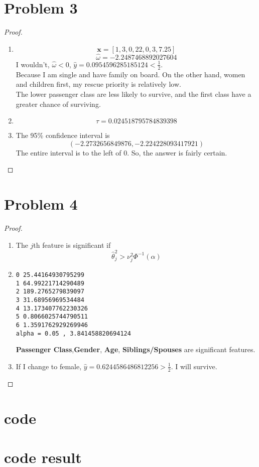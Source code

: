 \documentclass{article}
\begin{document}
\section*{Problem 3}
\begin{proof}
    \indent
    \begin{enumerate}[label=(\alph*)]
        \item $$\mathbf{x}=[1,
                            3,
                            0,
                            22,
                            0,
                            3,
                            7.25]$$
            $$\hat{\omega} = -2.2487468892027604$$
        I wouldn't, $\hat{\omega} < 0$, $\hat{y} = 0.0954596285185124 < \frac{1}{2}$.\\
        Because I am single and have family on board.
        On the other hand, women and children first, my rescue priority is relatively low.\\
        The lower passenger class are less likely to survive, and the first class have a greater chance of surviving.
        \item $$\tau = 0.024518795784839398$$
        \item The 95\% confidence interval is 
            $$(-2.2732656849876, -2.224228093417921)$$
            The entire interval is to the left of 0. So, the answer is fairly certain.
    \end{enumerate}
    \end{proof}

\section*{Problem 4}
    \begin{proof}
    \indent
    \begin{enumerate}[label=(\alph*)]
        \item  The $j$th feature is significant if
                $$\hat{\theta}_j^2 > \nu_j^2 \Phi^{-1}(\alpha)$$
        \item \begin{lstlisting}
0 25.44164930795299
1 64.99221714290489
2 189.2765279839097
3 31.68956969534484
4 13.173407762230326
5 0.8066025744790511
6 1.3591762929269946
alpha = 0.05 , 3.841458820694124
\end{lstlisting}
    \textbf{Passenger Class},\textbf{Gender}, \textbf{Age}, \textbf{Siblings/Spouses} are significant features.

        \item If I change to female, $\hat{y} = 0.6244586486812256 > \frac{1}{2}$. I will survive.
    \end{enumerate}
    \end{proof}
\pagebreak
\appendix
\section*{code}

\pagebreak
\section*{code result}

\end{document}
